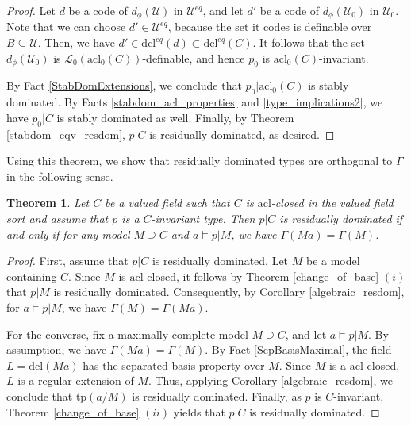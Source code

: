 \documentclass[12pt]{article}
\newcommand{\tpp}{\mathrm{tp}}
\newcommand{\acl}{\mathrm{acl}}
\newcommand{\dcl}{\mathrm{dcl}}
\newcommand{\0}{\emptyset}
\newcommand{\vf}{\mathrm{VF}}
\newcommand{\rf}{\mathrm{k}}
\newcommand{\U}{\mathcal{U}}
\newcommand{\Ualg}{\mathcal{U}_0}
\theoremstyle{plain}%
\newtheorem{thm}{Theorem}[section]
\theoremstyle{definition}
\theoremstyle{remark}
\begin{document}
\begin{proof}
Let $d$ be a code of $d_{\phi}(\U)$ in $\U^{eq}$, and let $d'$ be a code of $d_\phi(\Ualg)$ in $\Ualg$. Note that we can choose $d'\in\U^{eq}$, because the set it codes is definable over $B\subseteq \U$. Then, we have $d'\in \dcl^{eq}(d)\subset \dcl^{eq}(C)$. It follows that the set $d_{\phi}(\Ualg)$ is $\mathcal{L}_0(\acl_0(C))$-definable, and hence $p_0$ is $\acl_0(C)$-invariant. 

By Fact \ref{StabDomExtensions}, we conclude that $p_0|\acl_0(C)$ is stably dominated. By Facts \ref{stabdom_acl_properties} and \ref{type_implications2}, we have $p_0|C$ is stably dominated as well. Finally, by Theorem \ref{stabdom_eqv_resdom}, $p|C$ is residually dominated, as desired. \end{proof}

Using this theorem, we show that residually dominated types are orthogonal to $\Gamma$ in the following sense.

\begin{thm}\label{orthogonality_resdom}
    Let $C$ be a valued field such that $C$ is $\acl$-closed in the valued field sort and assume that $p$ is a $C$-invariant type. Then $p|C$ is residually dominated if and only if for any model $M\supseteq C$ and $a\models p|M$, we have $\Gamma(Ma)=\Gamma(M)$.
\end{thm}
\begin{proof}

First, assume that $p|C$ is residually dominated. Let $M$ be a model containing $C$. Since $M$ is $\acl$-closed, it follows by Theorem \ref{change_of_base} $(i)$ that $p|M$ is residually dominated. Consequently, by Corollary \ref{algebraic_resdom}, for $a \models p|M$, we have $\Gamma(M) = \Gamma(Ma)$.

For the converse, fix a maximally complete model $M\supseteq C$, and let $a \models p|M$. By assumption, we have $\Gamma(Ma)=\Gamma(M)$. By Fact \ref{SepBasisMaximal}, the field $L = \dcl(Ma)$ has the separated basis property over $M$. Since $M$ is a $\acl$-closed, $L$ is a regular extension of $M$. Thus, applying Corollary \ref{algebraic_resdom}, we conclude that $\tpp(a/M)$ is residually dominated. Finally, as $p$ is $C$-invariant, Theorem \ref{change_of_base} $(ii)$ yields that $p | C$ is residually dominated. \end{proof}





\end{document}
